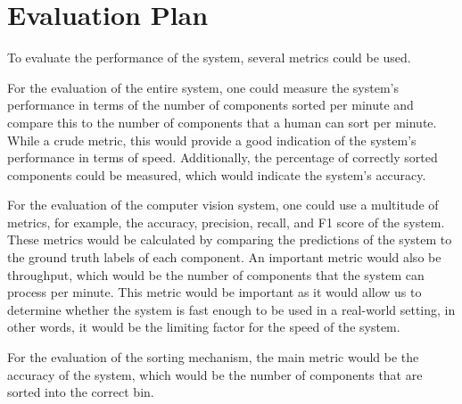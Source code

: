 \section{Evaluation Plan}
To evaluate the performance of the system, several metrics could be used.

For the evaluation of the entire system, one could measure the system's performance in terms of the number of components sorted per minute and compare
this to the number of components that a human can sort per minute. While a crude metric, this would provide a good indication of the system's performance
in terms of speed. Additionally, the percentage of correctly sorted components could be measured, which would indicate the system's accuracy.

For the evaluation of the computer vision system, one could use a multitude of metrics, for example, the accuracy, precision, recall, and F1 score of the
system. These metrics would be calculated by comparing the predictions of the system to the ground truth labels of each component. An important
metric would also be throughput, which would be the number of components that the system can process per minute. This metric would be important
as it would allow us to determine whether the system is fast enough to be used in a real-world setting, in other words, it would be the limiting factor
for the speed of the system.

For the evaluation of the sorting mechanism, the main metric would be the accuracy of the system, which would be the number of components that are
sorted into the correct bin.
